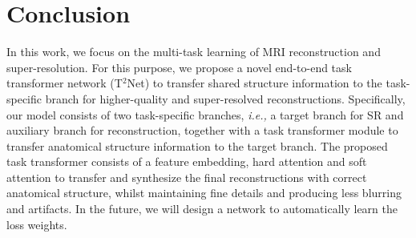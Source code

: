 \documentclass[runningheads]{llncs}
\newcommand{\ie}[1]{\textit{i.e.,}}
\begin{document}
\section{Conclusion}
In this work, we focus on the multi-task learning of MRI reconstruction and super-resolution. For this purpose, we propose a novel end-to-end task transformer network (T$^2$Net) to transfer shared structure information to the task-specific branch for higher-quality and super-resolved reconstructions. Specifically, our model consists of two task-specific branches, \ie, a target branch for SR and auxiliary branch for reconstruction, together with a task transformer module to transfer anatomical structure information to the target branch. The proposed task transformer consists of a feature embedding, hard attention and soft attention to transfer and synthesize the final reconstructions with correct anatomical structure, whilst maintaining fine details and producing less blurring and artifacts. In the future, we will design a network to automatically learn the loss weights.









\end{document}
